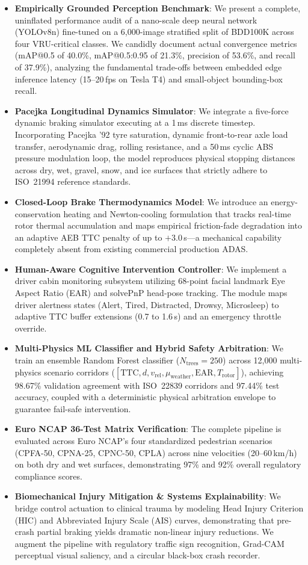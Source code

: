 \documentclass[3p,twocolumn]{elsarticle}
\begin{document}
\begin{itemize}
  \item \textbf{Empirically Grounded Perception Benchmark}: We present a complete, uninflated performance audit of a nano-scale deep neural network (YOLOv8n) fine-tuned on a 6,000-image stratified split of BDD100K across four VRU-critical classes. We candidly document actual convergence metrics (mAP@0.5 of 40.0\%, mAP@0.5:0.95 of 21.3\%, precision of 53.6\%, and recall of 37.9\%), analyzing the fundamental trade-offs between embedded edge inference latency (15--20\,fps on Tesla T4) and small-object bounding-box recall.
  \item \textbf{Pacejka Longitudinal Dynamics Simulator}: We integrate a five-force dynamic braking simulator executing at a 1\,ms discrete timestep. Incorporating Pacejka '92 tyre saturation, dynamic front-to-rear axle load transfer, aerodynamic drag, rolling resistance, and a 50\,ms cyclic ABS pressure modulation loop, the model reproduces physical stopping distances across dry, wet, gravel, snow, and ice surfaces that strictly adhere to ISO~21994 reference standards.
  \item \textbf{Closed-Loop Brake Thermodynamics Model}: We introduce an energy-conservation heating and Newton-cooling formulation that tracks real-time rotor thermal accumulation and maps empirical friction-fade degradation into an adaptive AEB TTC penalty of up to $+3.0$\,s---a mechanical capability completely absent from existing commercial production ADAS.
  \item \textbf{Human-Aware Cognitive Intervention Controller}: We implement a driver cabin monitoring subsystem utilizing 68-point facial landmark Eye Aspect Ratio (EAR) and solvePnP head-pose tracking. The module maps driver alertness states (Alert, Tired, Distracted, Drowsy, Microsleep) to adaptive TTC buffer extensions (0.7 to 1.6\,s) and an emergency throttle override.
  \item \textbf{Multi-Physics ML Classifier and Hybrid Safety Arbitration}: We train an ensemble Random Forest classifier ($N_{\text{trees}}=250$) across 12,000 multi-physics scenario corridors ($[\text{TTC}, d, v_{\text{rel}}, \mu_{\text{weather}}, \text{EAR}, T_{\text{rotor}}]$), achieving 98.67\% validation agreement with ISO~22839 corridors and 97.44\% test accuracy, coupled with a deterministic physical arbitration envelope to guarantee fail-safe intervention.
  \item \textbf{Euro NCAP 36-Test Matrix Verification}: The complete pipeline is evaluated across Euro NCAP's four standardized pedestrian scenarios (CPFA-50, CPNA-25, CPNC-50, CPLA) across nine velocities (20--60\,km/h) on both dry and wet surfaces, demonstrating 97\% and 92\% overall regulatory compliance scores.
  \item \textbf{Biomechanical Injury Mitigation \& Systems Explainability}: We bridge control actuation to clinical trauma by modeling Head Injury Criterion (HIC) and Abbreviated Injury Scale (AIS) curves, demonstrating that pre-crash partial braking yields dramatic non-linear injury reductions. We augment the pipeline with regulatory traffic sign recognition, Grad-CAM perceptual visual saliency, and a circular black-box crash recorder.
\end{itemize}
\end{document}
